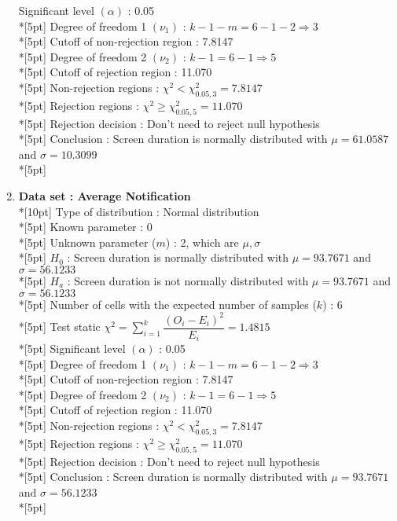 \begin{enumerate}
        Significant level \(\left(\alpha\right)\) : 0.05\\*[5pt]
        Degree of freedom 1 \((\nu_1)\) : $k - 1 - m = 6 - 1 - 2 \Rightarrow 3$\\*[5pt]
        Cutoff of non-rejection region : 7.8147\\*[5pt]
        Degree of freedom 2 \((\nu_2)\) : $k - 1 = 6 - 1 \Rightarrow 5$\\*[5pt]
        Cutoff of rejection region : 11.070\\*[5pt]
        Non-rejection regions : \(\chi^2 < \chi^2_{0.05, 3}=7.8147\)\\*[5pt]
        Rejection regions : \(\chi^2 \geq \chi^2_{0.05, 5}=11.070\)\\*[5pt]
        Rejection decision : Don't need to reject null hypothesis\\*[5pt]
        Conclusion : Screen duration is normally distributed with $\mu=61.0587$ and $\sigma=10.3099$\\*[5pt]
    \item \textbf{Data set : Average Notification}\\*[10pt]
        Type of distribution : Normal distribution\\*[5pt]
        Known parameter : 0\\*[5pt]
        Unknown parameter ($m$) : 2, which are \(\mu, \sigma\)\\*[5pt]
        $H_0$ : Screen duration is normally distributed with $\mu=93.7671$ and $\sigma=56.1233$\\*[5pt]
        $H_a$ : Screen duration is not normally distributed with $\mu=93.7671$ and $\sigma=56.1233$\\*[5pt]
        Number of cells with the expected number of samples ($k$) : 6\\*[5pt]
        Test static \(\chi^2=\displaystyle\sum\limits^k_{i=1}\dfrac{\left(O_i-E_i\right)^2}{E_i}=1.4815\)\\*[5pt]
        Significant level \(\left(\alpha\right)\) : 0.05\\*[5pt]
        Degree of freedom 1 \((\nu_1)\) : $k - 1 - m = 6 - 1 - 2 \Rightarrow 3$\\*[5pt]
        Cutoff of non-rejection region : 7.8147\\*[5pt]
        Degree of freedom 2 \((\nu_2)\) : $k - 1 = 6 - 1 \Rightarrow 5$\\*[5pt]
        Cutoff of rejection region : 11.070\\*[5pt]
        Non-rejection regions : \(\chi^2 < \chi^2_{0.05, 3}=7.8147\)\\*[5pt]
        Rejection regions : \(\chi^2 \geq \chi^2_{0.05, 5}=11.070\)\\*[5pt]
        Rejection decision : Don't need to reject null hypothesis\\*[5pt]
        Conclusion : Screen duration is normally distributed with $\mu=93.7671$ and $\sigma=56.1233$\\*[5pt]
\end{enumerate}
